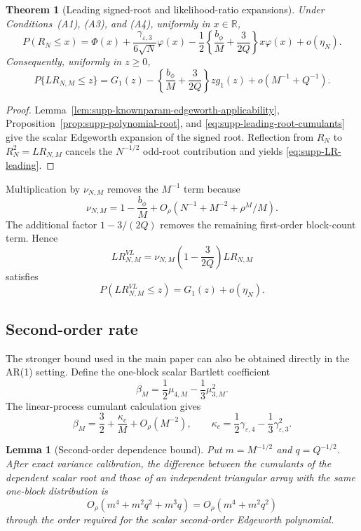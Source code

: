 \documentclass[12pt]{article}
\newtheorem{Theorem}[Proposition]{Theorem}
\newtheorem{Lemma}[Proposition]{Lemma}
\theoremstyle{remark}
\begin{document}
\begin{Theorem}[Leading signed-root and likelihood-ratio expansions]
\label{thm:supp-leading-expansion-ar1}
Under Conditions~(A1), (A3), and (A4), uniformly in $x\in\mathbb R$,
\[
P(R_N\le x)
=
\Phi(x)
+\frac{\gamma_{\varepsilon,3}}{6\sqrt N}\varphi(x)
-\frac12
\left\{\frac{b_\phi}{M}+\frac{3}{2Q}\right\}
x\varphi(x)
+o(\eta_N).
\]
Consequently, uniformly in $z\ge0$,
\begin{equation}
P\{LR_{N,M}\le z\}
=G_1(z)-\left\{\frac{b_\phi}{M}+\frac{3}{2Q}\right\}zg_1(z)
+o(M^{-1}+Q^{-1}).
\label{eq:supp-LR-leading}
\end{equation}
\end{Theorem}

\begin{proof}
Lemma~\ref{lem:supp-knownparam-edgeworth-applicability}, Proposition~\ref{prop:supp-polynomial-root}, and \eqref{eq:supp-leading-root-cumulants} give the scalar Edgeworth expansion of the signed root. Reflection from $R_N$ to $R_N^2=LR_{N,M}$ cancels the $N^{-1/2}$ odd-root contribution and yields \eqref{eq:supp-LR-leading}.
\end{proof}

Multiplication by $\nu_{N,M}$ removes the $M^{-1}$ term because
\[
\nu_{N,M}=1-\frac{b_\phi}{M}+O_\rho(N^{-1}+M^{-2}+\rho^M/M).
\]
The additional factor $1-3/(2Q)$ removes the remaining first-order block-count term. Hence
\[
LR^{VL}_{N,M}
=
\nu_{N,M}\left(1-\frac{3}{2Q}\right)LR_{N,M}
\]
satisfies
\[
P(LR^{VL}_{N,M}\le z)
=
G_1(z)+o(\eta_N).
\]

\subsection{Second-order rate}
The stronger bound used in the main paper can also be obtained directly in the AR(1) setting. Define the one-block scalar Bartlett coefficient
\[
\beta_M
=
\frac12\mu_{4,M}-\frac13\mu_{3,M}^2.
\]
The linear-process cumulant calculation gives
\begin{equation}
\beta_M
=
\frac32+\frac{\kappa_c}{M}+O_\rho(M^{-2}),
\qquad
\kappa_c=
\frac12\gamma_{\varepsilon,4}
-\frac13\gamma_{\varepsilon,3}^2.
\label{eq:supp-betaM-expansion}
\end{equation}

\begin{Lemma}[Second-order dependence bound]
\label{lem:supp-second-order-ledger-ar1}
Put $m=M^{-1/2}$ and $q=Q^{-1/2}$. After exact variance calibration, the difference between the cumulants of the dependent scalar root and those of an independent triangular array with the same one-block distribution is
\[
O_\rho(m^4+m^2q^2+m^3q)
=
O_\rho(m^4+m^2q^2)
\]
through the order required for the scalar second-order Edgeworth polynomial.
\end{Lemma}
\end{document}
